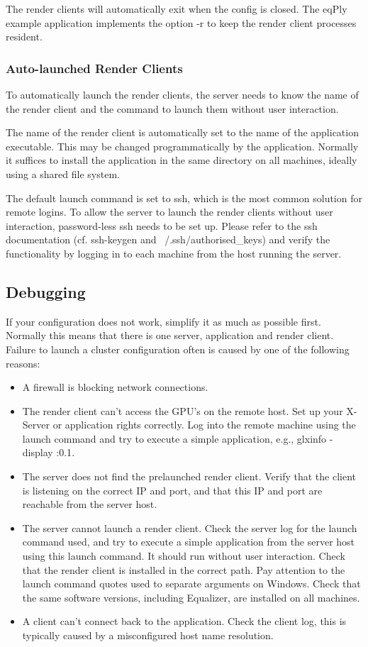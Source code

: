 \documentclass[10pt,a4]{scrartcl}
\begin{document}
The render clients will automatically exit when the config is closed. The
\textsf{eqPly} example application implements the option \textsf{-r} to keep the
render client processes resident.

\subsubsection{Auto-launched Render Clients}
To automatically launch the render clients, the server needs to know the name of
the render client and the command to launch them without user interaction.

The name of the render client is automatically set to the name of the
application executable. This may be changed programmatically by the
application. Normally it suffices to install the application in the same
directory on all machines, ideally using a shared file system.

The default launch command is set to ssh, which is the most common solution for
remote logins. To allow the server to launch the render clients without user
interaction, password-less ssh needs to be set up. Please refer to the ssh
documentation (cf. \textsf{ssh-keygen} and \textsf{~/.ssh/authorised\_keys}) and
verify the functionality by logging in to each machine from the host running the
server.

\subsection{Debugging}
If your configuration does not work, simplify it as much as possible
first. Normally this means that there is one server, application and render
client. Failure to launch a cluster configuration often is caused by one of the
following reasons:
\begin{itemize}
\item A firewall is blocking network connections.
\item The render client can't access the GPU's on the remote host. Set up your
  X-Server or application rights correctly. Log into the remote machine using
  the launch command and try to execute a simple application, e.g.,
  \textsf{glxinfo -display :0.1}.
\item The server does not find the prelaunched render client. Verify that the
  client is listening on the correct IP and port, and that this IP and port are
  reachable from the server host.
\item The server cannot launch a render client. Check the server log for the
  launch command used, and try to execute a simple application from the server
  host using this launch command. It should run without user interaction. Check
  that the render client is installed in the correct path. Pay attention to the
  launch command quotes used to separate arguments on Windows. Check that the
  same software versions, including Equalizer, are installed on all machines.
\item A client can't connect back to the application. Check the client log, this
  is typically caused by a misconfigured host name resolution.
\end{itemize}
\end{document}
